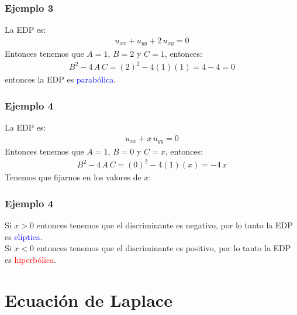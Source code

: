 \begin{frame}
\frametitle{Ejemplo 3}
La EDP es:
\begin{align*}
u_{xx} + u_{yy} + 2 \, u_{xy} = 0
\end{align*}
\pause
Entonces tenemos que $A = 1$, $B = 2$ y $C = 1$, entonces:
\begin{align*}
B^{2} - 4 \, A \, C = (2)^{2} - 4 (1)(1) = 4 - 4 = 0
\end{align*}
entonces la EDP es \textcolor{blue}{parabólica}.
\end{frame}
\begin{frame}
\frametitle{Ejemplo 4}
La EDP es:
\begin{align*}
u_{xx} + x \, u_{yy} = 0
\end{align*}
\pause
Entonces tenemos que $A = 1$, $B = 0$ y $C = x$, entonces:
\begin{align*}
B^{2} - 4 \, A \, C = (0)^{2} - 4 (1)(x) = - 4 \, x
\end{align*}
\pause
Tenemos que fijarnos en los valores de $x$:
\end{frame}
\begin{frame}
\frametitle{Ejemplo 4}
Si $x > 0$ entonces tenemos que el discriminante es negativo, por lo tanto la EDP es \textcolor{blue}{elíptica}.
\\
\bigskip
\pause
Si $x < 0$ entonces tenemos que el discriminante es positivo, por lo tanto la EDP es \textcolor{red}{hiperbólica}.
\end{frame}
\section{Ecuación de Laplace}
